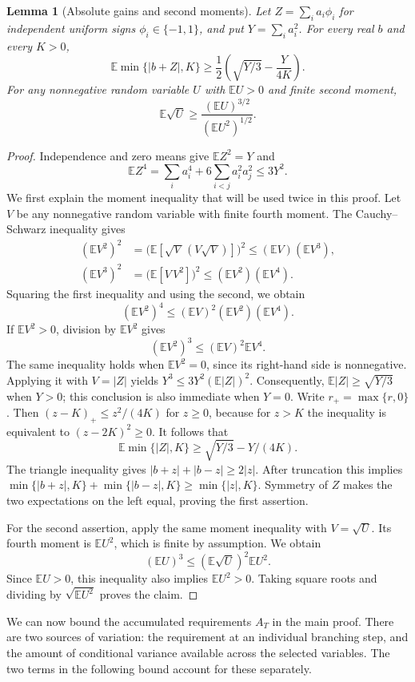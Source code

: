 \documentclass[11pt,a4paper]{article}
\newtheorem{lemma}[theorem]{Lemma}
\theoremstyle{definition}
\theoremstyle{remark}
\newcommand{\E}{\mathbb E}
\begin{document}
\begin{lemma}[Absolute gains and second moments]\label{lem:random_moments}
Let $Z=\sum_i a_i\phi_i$ for independent uniform signs
$\phi_i\in\{-1,1\}$, and put
$Y=\sum_i a_i^2$. For every real $b$ and every $K>0$,
\[
 \E\min\{|b+Z|,K\}
 \ge\frac12\left(\sqrt{Y/3}-\frac{Y}{4K}\right).
\]
For any nonnegative random variable $U$ with $\E U>0$ and finite second
moment,
\[
 \E\sqrt U\ge\frac{(\E U)^{3/2}}{(\E U^2)^{1/2}}.
\]
\end{lemma}
\begin{proof}
Independence and zero means give $\E Z^2=Y$ and
\[
 \E Z^4=\sum_i a_i^4+6\sum_{i<j}a_i^2a_j^2\le3Y^2.
\]
We first explain the moment inequality that will be used twice in this
proof. Let $V$ be any nonnegative random variable with finite fourth
moment. The Cauchy--Schwarz inequality gives
\begin{align*}
 (\E V^2)^2
 &=\bigl(\E[\sqrt V\,(V\sqrt V)]\bigr)^2
 \le (\E V)(\E V^3),\\
 (\E V^3)^2
 &=\bigl(\E[V\,V^2]\bigr)^2
 \le (\E V^2)(\E V^4).
\end{align*}
Squaring the first inequality and using the second, we obtain
\[
 (\E V^2)^4\le (\E V)^2(\E V^2)(\E V^4).
\]
If $\E V^2>0$, division by $\E V^2$ gives
\[
 (\E V^2)^3\le (\E V)^2\E V^4.
\]
The same inequality holds when $\E V^2=0$, since its right-hand side
is nonnegative. Applying it with $V=|Z|$ yields
$Y^3\le3Y^2(\E|Z|)^2$. Consequently,
$\E|Z|\ge\sqrt{Y/3}$ when $Y>0$; this conclusion is also immediate
when $Y=0$.
Write $r_+=\max\{r,0\}$. Then $(z-K)_+\le z^2/(4K)$ for $z\ge0$,
because for $z>K$
the inequality is equivalent to $(z-2K)^2\ge0$.
It follows that
\[
 \E\min\{|Z|,K\}\ge\sqrt{Y/3}-Y/(4K).
\]
The triangle inequality gives $|b+z|+|b-z|\ge2|z|$.
After truncation this implies
$\min\{|b+z|,K\}+\min\{|b-z|,K\}\ge\min\{|z|,K\}$.
Symmetry of $Z$ makes the two expectations on the left equal,
proving the first assertion.

For the second assertion, apply the same moment inequality with
$V=\sqrt U$. Its fourth moment is $\E U^2$, which is finite by
assumption. We obtain
\[
 (\E U)^3\le(\E\sqrt U)^2\E U^2.
\]
Since $\E U>0$, this inequality also implies $\E U^2>0$.
Taking square roots and dividing by $\sqrt{\E U^2}$ proves the claim.
\end{proof}

We can now bound the accumulated requirements $A_T$ in the main proof.
There are two sources of variation: the requirement at an individual
branching step, and the amount of conditional variance available across
the selected variables. The two terms in the following bound account
for these separately.
\end{document}
